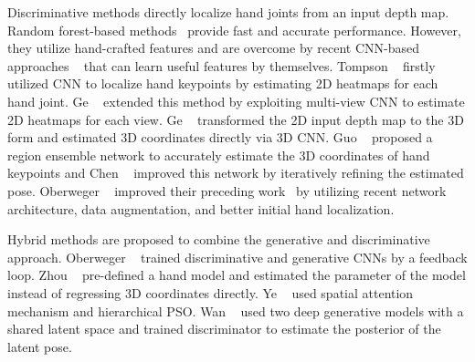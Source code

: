 Discriminative methods directly localize hand joints from an input depth map. Random forest-based methods~\cite{keskin2012hand,tang2013real,tang2014latent,liang2014parsing,sun2015cascaded,tang2015opening,wan2016hand} provide fast and accurate performance. However, they utilize hand-crafted features and are overcome by recent CNN-based approaches ~\cite{tompson2014real,oberweger2015hands,ge2016robust,sinha2016deephand,bouchacourt2016disco,yang2016hand,deng2017hand3d,ge20173d,guo2017ren,guo2017towards,chen2017pose,madadi2017end,fourure2017multi,xu2017lie,Choi_2017_ICCV,Oberweger_2017_ICCV_Workshops} that can learn useful features by themselves. Tompson \etal~\cite{tompson2014real} firstly utilized CNN to localize hand keypoints by estimating 2D heatmaps for each hand joint. Ge \etal~\cite{ge2016robust} extended this method by exploiting multi-view CNN to estimate 2D heatmaps for each view. Ge \etal~\cite{ge20173d} transformed the 2D input depth map to the 3D form and estimated 3D coordinates directly via 3D CNN. Guo \etal~\cite{guo2017ren,guo2017towards} proposed a region ensemble network to accurately estimate the 3D coordinates of hand keypoints and Chen \etal~\cite{chen2017pose} improved this network by iteratively refining the estimated pose. Oberweger \etal~\cite{Oberweger_2017_ICCV_Workshops} improved their preceding work~\cite{oberweger2015hands} by utilizing recent network architecture, data augmentation, and better initial hand localization.

Hybrid methods are proposed to combine the generative and discriminative approach. Oberweger \etal~\cite{oberweger2015training} trained discriminative and generative CNNs by a feedback loop. Zhou \etal~\cite{zhou2016model} pre-defined a hand model and estimated the parameter of the model instead of regressing 3D coordinates directly. Ye \etal~\cite{ye2016spatial} used spatial attention mechanism and hierarchical PSO. Wan \etal~\cite{Wan_2017_CVPR} used two deep generative models with a shared latent space and trained discriminator to estimate the posterior of the latent pose.


